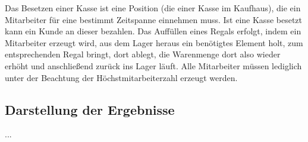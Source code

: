 Das Besetzen einer Kasse ist eine Position (die einer Kasse im Kaufhaus), die ein Mitarbeiter für eine bestimmt Zeitspanne einnehmen muss. Ist eine Kasse besetzt kann ein Kunde an dieser bezahlen. Das Auffüllen eines Regals erfolgt, indem ein Mitarbeiter erzeugt wird, aus dem Lager heraus ein benötigtes Element holt, zum entsprechenden Regal bringt, dort ablegt, die Warenmenge dort also wieder erhöht und anschließend zurück ins Lager läuft. Alle Mitarbeiter müssen lediglich unter der Beachtung der Höchstmitarbeiterzahl erzeugt werden.

\subsection{Darstellung der Ergebnisse}
...